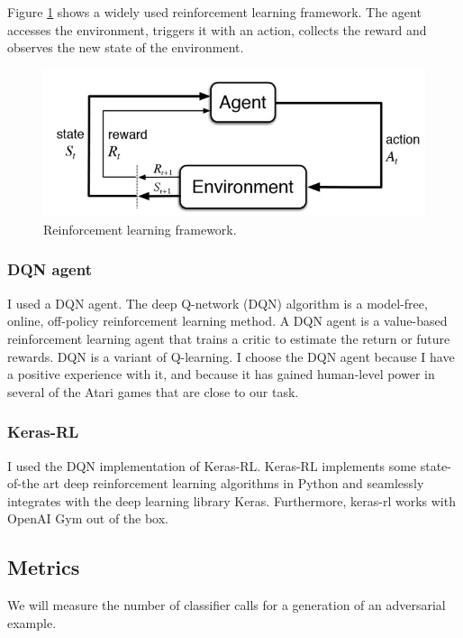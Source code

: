 \documentclass{article}
\begin{document}
Figure \ref{fig:rl_model} shows a widely used reinforcement learning framework. The agent accesses the environment, triggers it with an action, collects the reward and observes the new state of the environment.

\begin{figure}[H]
    \centering
        \includegraphics[scale=.8]{reinforcement-learning-fig1-700.jpg}
    \caption{Reinforcement learning framework.}
    \label{fig:rl_model}
\end{figure}


\subsubsection{DQN agent}
I used a DQN agent. The deep Q-network (DQN) algorithm is a model-free, online, off-policy reinforcement learning method. A DQN agent is a value-based reinforcement learning agent that trains a critic to estimate the return or future rewards. DQN is a variant of Q-learning. I choose the DQN agent because I have a positive experience with it, and because it has gained human-level power in several of the Atari games that are close to our task.

\subsubsection{Keras-RL}
I used the DQN implementation of Keras-RL. Keras-RL \cite{plappert2016kerasrl} implements some state-of-the art deep reinforcement learning algorithms in Python and seamlessly integrates with the deep learning library Keras. Furthermore, keras-rl works with OpenAI Gym out of the box. 

\subsection{Metrics}

We will measure the number of classifier calls for a generation of an adversarial example.
\end{document}
